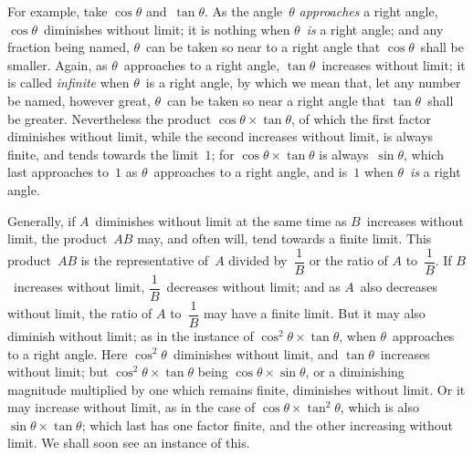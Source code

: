 \documentclass[12pt]{book}[2005/09/16]
\newcommand{\Pagelabel}[1]{\phantomsection\label{page:#1}}
\newcommand{\PageSep}[1]{\Pagelabel{#1}\ignorespaces}
\renewcommand{\(}{{\upshape(}}
\renewcommand{\)}{{\upshape)}}
\begin{document}
For example, take $\cos\theta$ and~$\tan\theta$. As the angle~$\theta$
\emph{approaches} a right angle, $\cos\theta$~diminishes without
limit; it is nothing when $\theta$~\emph{is} a right angle; and any
fraction being named, $\theta$~can be taken so near to a
right angle that $\cos\theta$~shall be smaller. Again, as $\theta$~approaches
to a right angle, $\tan\theta$~increases without
limit; it is called \emph{infinite} when $\theta$~is a right angle, by
which we mean that, let any number be named, however
great, $\theta$~can be taken so near a right angle that
$\tan\theta$~shall be greater. Nevertheless the product $\cos\theta × \tan\theta$,
\PageSep{116}
of which the first factor diminishes without limit,
while the second increases without limit, is always
finite, and tends towards the limit~$1$; for $\cos\theta × \tan\theta$
is always~$\sin\theta$, which last approaches to~$1$ as $\theta$~approaches
to a right angle, and is~$1$ when $\theta$~\emph{is} a right
angle.

Generally, if $A$~diminishes without limit at the
same time as $B$~increases without limit, the product~$AB$
may, and often will, tend towards a finite limit.
This product~$AB$ is the representative of~$A$ divided by~$\dfrac{1}{B}$
or the ratio of $A$ to~$\dfrac{1}{B}$. If $B$~increases without
limit, $\dfrac{1}{B}$~decreases without limit; and as $A$~also decreases
without limit, the ratio of $A$ to~$\dfrac{1}{B}$ may have a
finite limit. But it may also diminish without limit;
as in the instance of $\cos^{2}\theta × \tan\theta$, when $\theta$~approaches
to a right angle. Here $\cos^{2}\theta$~diminishes without limit,
and $\tan\theta$~increases without limit; but $\cos^{2}\theta × \tan\theta$
being $\cos\theta × \sin\theta$, or a diminishing magnitude multiplied
by one which remains finite, diminishes without
limit. Or it may increase without limit, as in the case
of $\cos\theta × \tan^{2}\theta$, which is also $\sin\theta × \tan\theta$; which last
has one factor finite, and the other increasing without
limit. We shall soon see an instance of this.
\end{document}
